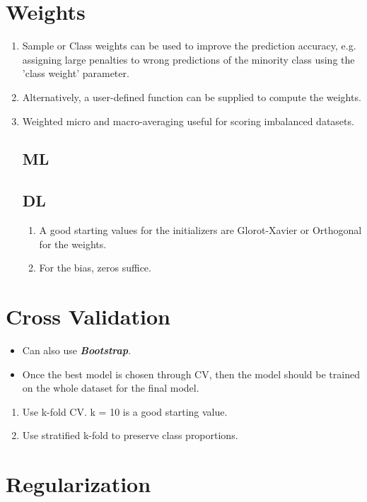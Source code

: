 \documentclass[a4paper, 12pt]{report}
\begin{document}
\section{Weights}
\label{sec:weights}
\begin{enumerate}
\item Sample or Class weights can be used to improve the prediction accuracy, e.g. assigning large penalties to wrong predictions of the minority class using the 'class weight' parameter.
\item Alternatively, a user-defined function can be supplied to compute the weights.
\item Weighted micro and macro-averaging useful for scoring imbalanced datasets.

\subsection{ML}

\subsection{DL}
\begin{enumerate}
\item A good starting values for the initializers are Glorot-Xavier or Orthogonal for the weights.
\item For the bias, zeros suffice.
\end{enumerate}
\end{enumerate}

\section{Cross Validation}
\begin{itemize}
\item Can also use \textbf{\textit{Bootstrap}}.
\item Once the best model is chosen through CV, then the model should be trained on the whole dataset for the final model.
\end{itemize}
\begin{enumerate}
\item Use k-fold CV. k = 10 is a good starting value.
\item Use stratified k-fold to preserve class proportions.
\end{enumerate}


\section{Regularization}
\label{sec:regularization}
\end{document}
